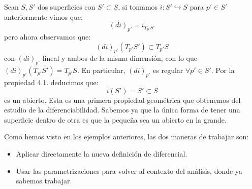 \begin{ejemplo}
    Sean $S,S'$ dos superficies con $S'\subset S$, si tomamos $i:S'\hookrightarrow S$ para $p'\in S'$ anteriormente vimos que:
    \begin{equation*}
        (d i)_{p'} = i_{T_{p'}S'}
    \end{equation*}
    pero ahora observamos que:
    \begin{equation*}
        (d i)_{p'}(T_{p'}S')\subset T_{p'}S
    \end{equation*}
    con $(d i)_{p'}$ lineal y ambos de la misma dimensión, con lo que $(d i)_{p'}(T_{p'}S')= T_{p'}S$. En particular, $(di)_{p'}$ es regular $\forall p'\in S'$. Por la propiedad 4.1. deducimos que:
    \begin{equation*}
        i(S') = S'\subset S
    \end{equation*}
    es un abierto. Esta es una primera propiedad geométrica que obtenemos del estudio de la diferenciabilidad. Sabemos ya que la única forma de tener una superficie dentro de otra es que la pequeña sea un abierto en la grande.
\end{ejemplo}

\noindent
Como hemos visto en los ejemplos anteriores, las dos maneras de trabajar son:
\begin{itemize}
    \item Aplicar directamente la nueva definición de diferencial.
    \item Usar las parametrizaciones para volver al contexto del análisis, donde ya sabemos trabajar.
\end{itemize}

